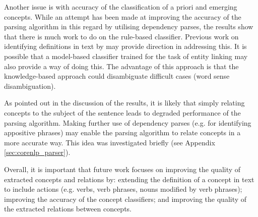 \documentclass[12pt]{article}
\theoremstyle{grammarstyle}
\begin{document}
Another issue is with accuracy of the classification of a priori and emerging concepts. While an attempt has been made at improving the accuracy of the parsing algorithm in this regard by utilising dependency parses, the results show that there is much work to do on the rule-based classifier. Previous work on identifying definitions in text by \cite{fahmi2006learning, saggion2004identifying, iftene2008grammar, borg2007towards, borg2007discovering} may provide direction in addressing this. It is possible that a model-based classifier trained for the task of entity linking may also provide a way of doing this. The advantage of this approach is that the knowledge-based approach could disambiguate difficult cases (word sense disambiguation).

As pointed out in the discussion of the results, it is likely that simply relating concepts to the subject of the sentence leads to degraded performance of the parsing algorithm. Making further use of dependency parses (e.g. for identifying appositive phrases) may enable the parsing algorithm to relate concepts in a more accurate way. This idea was investigated briefly (see Appendix \ref{sec:corenlp_parser}).

Overall, it is important that future work focuses on improving the quality of extracted concepts and relations by: extending the definition of a concept in text to include actions (e.g. verbs, verb phrases, nouns modified by verb phrases); improving the accuracy of the concept classifiers; and improving the quality of the extracted relations between concepts.

\end{document}
